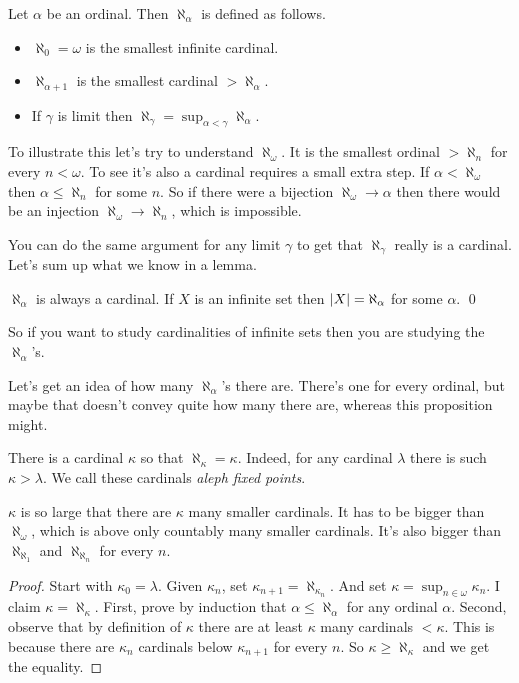 \documentclass[10pt]{amsart}
\begin{document}
\begin{definition}
Let $\alpha$ be an ordinal. Then $\aleph_\alpha$ is defined as follows.
\begin{itemize}
\item $\aleph_0 = \omega$ is the smallest infinite cardinal.
\item $\aleph_{\alpha+1}$ is the smallest cardinal $>\aleph_\alpha$.
\item If $\gamma$ is limit then $\aleph_\gamma = \sup_{\alpha < \gamma} \aleph_\alpha$.
\end{itemize}
\end{definition}


To illustrate this let's try to understand $\aleph_\omega$. It is the smallest ordinal $> \aleph_n$ for every $n < \omega$. To see it's also a cardinal requires a small extra step. If $\alpha < \aleph_\omega$ then $\alpha \le \aleph_n$ for some $n$. So if there were a bijection $\aleph_\omega \to \alpha$ then there would be an injection $\aleph_\omega \to \aleph_n$, which is impossible. 

You can do the same argument for any limit $\gamma$ to get that $\aleph_\gamma$ really is a cardinal. Let's sum up what we know in a lemma.

\begin{lemma}
$\aleph_\alpha$ is always a cardinal. If $X$ is an infinite set then $\left\lvert X \right\rvert = \aleph_\alpha$ for some $\alpha$. \qed
\end{lemma}

So if you want to study cardinalities of infinite sets then you are studying the $\aleph_\alpha$'s. 

Let's get an idea of how many $\aleph_\alpha$'s there are. There's one for every ordinal, but maybe that doesn't convey quite how many there are, whereas this proposition might.

\begin{proposition}
There is a cardinal $\kappa$ so that $\aleph_\kappa = \kappa$. Indeed, for any cardinal $\lambda$ there is such $\kappa > \lambda$. We call these cardinals \emph{aleph fixed points}.
\end{proposition}

$\kappa$ is so large that there are $\kappa$ many smaller cardinals. It has to be bigger than $\aleph_\omega$, which is above only countably many smaller cardinals. It's also bigger than $\aleph_{\aleph_1}$ and $\aleph_{\aleph_n}$ for every $n$.

\begin{proof}
Start with $\kappa_0 = \lambda$. Given $\kappa_n$, set $\kappa_{n+1} = \aleph_{\kappa_n}$. And set $\kappa = \sup_{n \in \omega} \kappa_n$. I claim $\kappa = \aleph_\kappa$. First, prove by induction that $\alpha \le \aleph_\alpha$ for any ordinal $\alpha$. Second, observe that by definition of $\kappa$ there are at least $\kappa$ many cardinals $< \kappa$. This is because there are $\kappa_n$ cardinals below $\kappa_{n+1}$ for every $n$. So $\kappa \ge \aleph_\kappa$ and we get the equality.
\end{proof}
\end{document}

